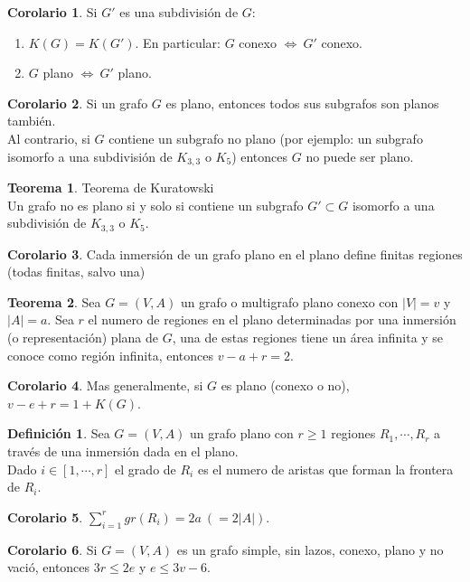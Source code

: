 \documentclass[10pt]{article}
\theoremstyle{definition}
\newtheorem{definition}{Definición}[section]
\newtheorem{theorem}{Teorema}[section]
\newtheorem{corollary}{Corolario}[theorem]
\begin{document}
\begin{corollary}
    Si $G'$ es una subdivisión de $G$:
    \begin{enumerate}
        \item $K(G)=K(G')$. En particular: $G$ conexo $\Leftrightarrow\ G'$ conexo.
        \item $G$ plano $\Leftrightarrow\ G'$ plano.
    \end{enumerate}    
\end{corollary}
\begin{corollary}
    Si un grafo $G$ es plano, entonces todos sus subgrafos son planos también.\\
    Al contrario, si $G$ contiene un subgrafo no plano (por ejemplo: un subgrafo isomorfo a una subdivisión de $K_{3,3}$ o $K_5$) entonces $G$ no puede ser plano.
\end{corollary}
\begin{theorem}{Teorema de Kuratowski}
    \\Un grafo no es plano si y solo si contiene un subgrafo $G'\subset G$ isomorfo a una subdivisión de $K_{3,3}$ o $K_5$.
\end{theorem}
\begin{corollary}
    Cada inmersión de un grafo plano en el plano define finitas regiones (todas finitas, salvo una)
\end{corollary}
\begin{theorem}
    Sea $G=(V,A)$ un grafo o multigrafo plano conexo con $|V|=v$ y $|A|=a$. Sea $r$ el numero de regiones en el plano determinadas por una inmersión (o representación) plana de $G$, una de estas regiones tiene un área infinita y se conoce como región infinita, entonces $v-a+r=2$.
\end{theorem}
\begin{corollary}
    Mas generalmente, si $G$ es plano (conexo o no), $v-e+r=1+K(G)$.
\end{corollary}
\begin{definition}
    Sea $G=(V,A)$ un grafo plano con $r\ge1$ regiones $R_1,\cdots,R_r$ a través de una inmersión dada en el plano.\\
    Dado $i\in[1,\cdots,r]$ el grado de $R_i$ es el numero de aristas que forman la frontera de $R_i$.
\end{definition}
\begin{corollary}
    $\sum_{i=1}^{r} gr(R_i)=2a\ (=2|A|)$.
\end{corollary}
\begin{corollary}
    Si $G=(V,A)$ es un grafo simple, sin lazos, conexo, plano y no vació, entonces $3r\le 2e$ y $e\le 3v-6$.
\end{corollary}
\end{document}
